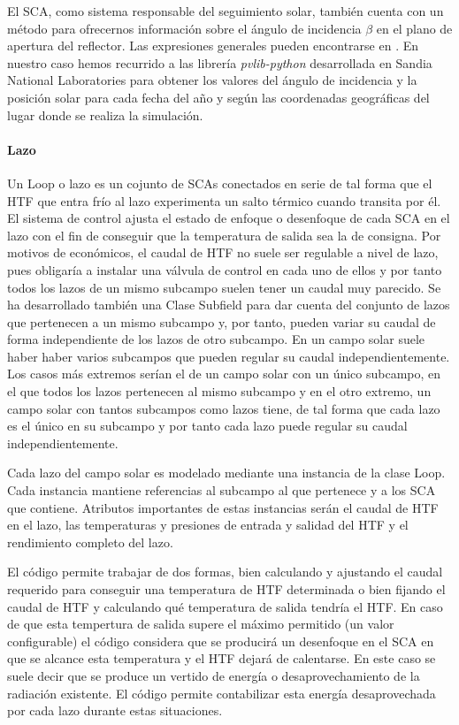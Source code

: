 \documentclass[11pt]{article}
\begin{document}
El SCA, como sistema responsable del seguimiento solar, también cuenta
con un método para ofrecernos información sobre el ángulo de incidencia
\(\beta\) en el plano de apertura del reflector. Las expresiones
generales pueden encontrarse en \cite{1022085/95AM6AQN}. En nuestro caso
hemos recurrido a las librería \emph{pvlib-python}
\cite{1022085/GUC54R5I} desarrollada en Sandia National Laboratories
para obtener los valores del ángulo de incidencia y la posición solar
para cada fecha del año y según las coordenadas geográficas del lugar
donde se realiza la simulación.

\hypertarget{lazo}{%
\paragraph{Lazo}\label{lazo}}

Un Loop o lazo es un cojunto de SCAs conectados en serie de tal forma
que el HTF que entra frío al lazo experimenta un salto térmico cuando
transita por él. El sistema de control ajusta el estado de enfoque o
desenfoque de cada SCA en el lazo con el fin de conseguir que la
temperatura de salida sea la de consigna. Por motivos de económicos, el
caudal de HTF no suele ser regulable a nivel de lazo, pues obligaría a
instalar una válvula de control en cada uno de ellos y por tanto todos
los lazos de un mismo subcampo suelen tener un caudal muy parecido. Se
ha desarrollado también una Clase Subfield para dar cuenta del conjunto
de lazos que pertenecen a un mismo subcampo y, por tanto, pueden variar
su caudal de forma independiente de los lazos de otro subcampo. En un
campo solar suele haber haber varios subcampos que pueden regular su
caudal independientemente. Los casos más extremos serían el de un campo
solar con un único subcampo, en el que todos los lazos pertenecen al
mismo subcampo y en el otro extremo, un campo solar con tantos subcampos
como lazos tiene, de tal forma que cada lazo es el único en su subcampo
y por tanto cada lazo puede regular su caudal independientemente.

Cada lazo del campo solar es modelado mediante una instancia de la clase
Loop. Cada instancia mantiene referencias al subcampo al que pertenece y
a los SCA que contiene. Atributos importantes de estas instancias serán
el caudal de HTF en el lazo, las temperaturas y presiones de entrada y
salidad del HTF y el rendimiento completo del lazo.

El código permite trabajar de dos formas, bien calculando y ajustando el
caudal requerido para conseguir una temperatura de HTF determinada o
bien fijando el caudal de HTF y calculando qué temperatura de salida
tendría el HTF. En caso de que esta tempertura de salida supere el
máximo permitido (un valor configurable) el código considera que se
producirá un desenfoque en el SCA en que se alcance esta temperatura y
el HTF dejará de calentarse. En este caso se suele decir que se produce
un vertido de energía o desaprovechamiento de la radiación existente. El
código permite contabilizar esta energía desaprovechada por cada lazo
durante estas situaciones.
\end{document}
